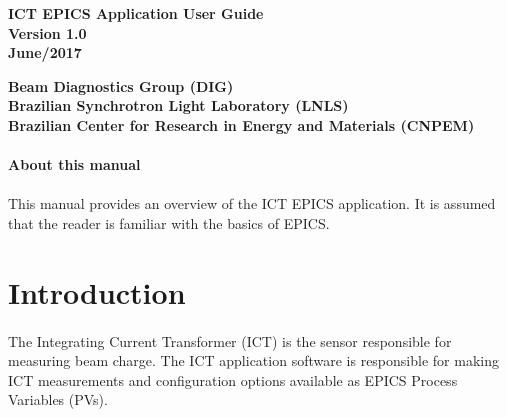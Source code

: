 \documentclass[openany]{article}
\begin{document}
\begin{titlepage}

\thispagestyle{fancy}

\begin{center}

\vspace*{\fill}
\textbf{\Huge ICT EPICS Application User Guide}\\[20pt]
\textbf{\Huge Version 1.0}\\[20pt]
\textbf{\Huge June/2017}
\vspace*{\fill}

\vfill
\textbf{Beam Diagnostics Group (DIG)}\\[5pt]
\textbf{Brazilian Synchrotron Light Laboratory (LNLS)}\\[5pt]
\textbf{Brazilian Center for Research in Energy and Materials (CNPEM)}
\end{center}

\end{titlepage}

\newpage
\pagestyle{plain} %

\paragraph{}{\Large\bfseries About this manual}

\paragraph{} This manual provides an overview of the ICT EPICS application. It is assumed that the reader is familiar with the basics of EPICS.

\tableofcontents

\newpage
\section{Introduction}

\paragraph{} The Integrating Current Transformer (ICT) is the sensor responsible for measuring beam charge. The ICT application software is responsible for making ICT measurements and configuration options available as EPICS Process Variables (PVs).
\end{document}
